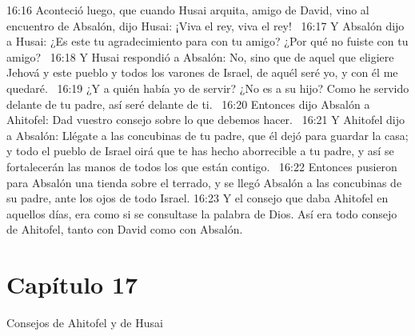 16:16 Aconteció luego, que cuando Husai arquita, amigo de David, vino al encuentro de Absalón, dijo Husai: ¡Viva el rey, viva el rey!  
16:17 Y Absalón dijo a Husai: ¿Es este tu agradecimiento para con tu amigo? ¿Por qué no fuiste con tu amigo?  
16:18 Y Husai respondió a Absalón: No, sino que de aquel que eligiere Jehová y este pueblo y todos los varones de Israel, de aquél seré yo, y con él me quedaré.  
16:19 ¿Y a quién había yo de servir? ¿No es a su hijo? Como he servido delante de tu padre, así seré delante de ti.  
16:20 Entonces dijo Absalón a Ahitofel: Dad vuestro consejo sobre lo que debemos hacer.  
16:21 Y Ahitofel dijo a Absalón: Llégate a las concubinas de tu padre, que él dejó para guardar la casa; y todo el pueblo de Israel oirá que te has hecho aborrecible a tu padre, y así se fortalecerán las manos de todos los que están contigo.  
16:22 Entonces pusieron para Absalón una tienda sobre el terrado, y se llegó Absalón a las concubinas de su padre, ante los ojos de todo Israel. 
16:23 Y el consejo que daba Ahitofel en aquellos días, era como si se consultase la palabra de Dios. Así era todo consejo de Ahitofel, tanto con David como con Absalón.  
\section*{Capítulo 17 }
Consejos de Ahitofel y de Husai  


